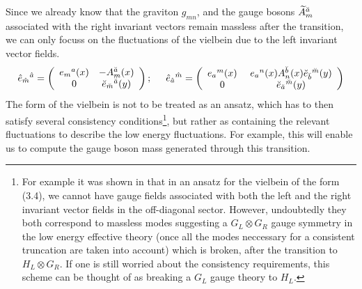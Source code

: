 \documentclass[a4paper,12pt]{article}
\begin{document}
Since we already know that the graviton $g_{mn}$, and the gauge bosons $\widetilde{A}^{\breve{a}}_m$ associated with the right invariant  vectors remain massless after the transition, we can only focuss on the fluctuations of the vielbein due to the left invariant vector fields. 
\begin{equation}
\hat{e}_{\hat{m}}{}^{\hat{a}}=\left( \begin{array}{cc}
e_m{}^{a}(x) & -A_m^{\breve{a}}(x)\\
0 &\breve{e}_{\breve{m}}{}^{\breve{a}}(y)
\end{array} \right);
\hspace{5mm}
\hat{e}_{\hat{a}}{}^{\hat{m}}=\left( \begin{array}{cc}
e_{a}{}^{m}(x) & \ e_a{}^n(x)A_n^{\breve{b}}(x)\breve{e}_{\breve{b}}{}^{\breve{m}}(y)\\
0 &\ \breve{e}_{\breve{a}}{}^{\breve{m}}(y)
\end{array} \right)
\end{equation}
The form of the vielbein is not to be treated as an ansatz, which has to then satisfy several consistency conditions\footnote{For example it was shown in \cite{consistency} that in an ansatz for the vielbein of the form (3.4), we cannot have gauge fields associated with both the left and the right invariant vector fields in the off-diagonal sector. However, undoubtedly they both correspond to massless modes suggesting a $G_L\otimes G_R$ gauge symmetry in the low energy effective theory (once all the modes neccessary for a consistent truncation are taken into account) which is broken, after the transition to $H_L\otimes G_R$. If one is still worried about the consistency requirements, this scheme can be thought of as breaking a $G_L$ gauge theory to $H_L$.}, but rather as containing the relevant fluctuations to describe the low energy fluctuations. For example, this will enable us to compute the gauge boson mass generated through this transition.
\end{document}
